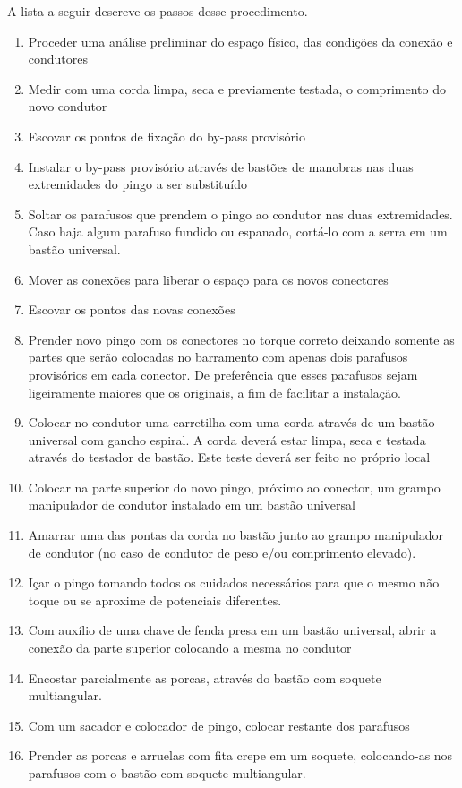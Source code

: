 A lista a seguir descreve os passos desse procedimento.
\begin{enumerate}
\item Proceder uma análise preliminar do espaço físico, das condições da conexão e condutores
\item Medir com uma corda limpa, seca e previamente testada, o comprimento do novo condutor
\item Escovar os pontos de fixação do by-pass provisório
\item Instalar o by-pass provisório através de bastões de manobras nas duas extremidades do pingo a ser substituído
\item Soltar os parafusos que prendem o pingo ao condutor nas duas extremidades. Caso haja algum parafuso fundido ou espanado, cortá-lo com a serra em um bastão universal.
\item Mover as conexões para liberar o espaço para os novos conectores
\item Escovar os pontos das novas conexões
\item Prender novo pingo com os conectores no torque correto deixando somente as partes que serão colocadas no barramento com apenas dois parafusos provisórios em cada conector. De preferência que esses parafusos sejam ligeiramente maiores que os originais, a fim de facilitar a instalação.
\item Colocar no condutor uma carretilha com uma corda através de um bastão universal com gancho espiral. A corda deverá estar limpa, seca e testada através do testador de bastão. Este teste deverá ser feito no próprio local
\item Colocar na parte superior do novo pingo, próximo ao conector, um grampo manipulador de condutor instalado em um bastão universal
\item Amarrar uma das pontas da corda no bastão junto ao grampo manipulador de condutor (no caso de condutor de peso e/ou comprimento elevado).
\item Içar o pingo tomando todos os cuidados necessários para que o mesmo não toque ou se aproxime de potenciais diferentes. 
\item Com auxílio de uma chave de fenda presa em um bastão universal, abrir a conexão da parte superior colocando a mesma no condutor
\item Encostar parcialmente as porcas, através do bastão com soquete multiangular.
\item Com um sacador e colocador de pingo, colocar restante dos parafusos
\item Prender as porcas e arruelas com fita crepe em um soquete, colocando-as nos parafusos com o bastão com soquete multiangular.

\end{enumerate}
